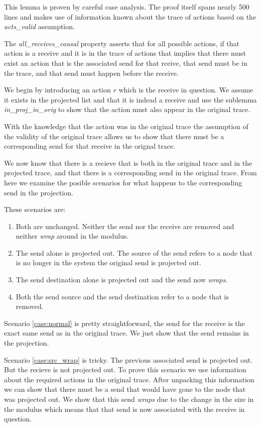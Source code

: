 \documentclass[runningheads]{llncs}
\begin{document}
This lemma is proven by careful case analysis. The proof itself spans nearly 500 lines and makes use of information known about the trace of actions based on the \emph{acts\_valid} assumption. 

The \emph{all\_receives\_causal} property asserts that for all possible actions, if that action is a receive and it is in the trace of actions that implies that there must exist an action that is the associated send for that rceive, that send must be in the trace, and that send must happen before the receive. 

We begin by introducing an action $r$ which is the receive in question. We assume it exists in the projected list and that it is indead a receive and use the sublemma \emph{in\_proj\_in\_orig} to show that the action must also appear in the original trace. 

With the knowledge that the action was in the original trace the assumption of the validity of the original trace allows us to show that there must be a corresponding send for that receive in the orignal trace. 

We now know that there is a recieve that is both in the original trace and in the projected trace, and that there is a corresponding send in the original trace. From here we examine the posible scenarios for what happens to the corresponding send in the projection.

These scenarios are:
\begin{enumerate}
\item \label{case:normal} Both are unchanged. Neither the send nor the receive are removed and neither \emph{wrap} around in the modulus.
\item \label{case:src_wrap} The send alone is projected out. The source of the send refers to a node that is no longer in the system the original send is projected out.
\item \label{case:dest_wrap} The send destination alone is projected out and the send now \emph{wraps}.
\item \label{case:both_wrap} Both the send source and the send destination refer to a node that is removed. 
\end{enumerate}


Scenario \ref{case:normal} is pretty straightforward, the send for the receive is the exact same send as in the original trace. We just show that the send remains in the projection.

Scenario \ref{case:src_wrap} is tricky. The previous associated send is projected out. But the recieve is not projected out. To prove this scenario we use information about the required actions in the original trace. After unpacking this information we can show that there must be a send that would have gone to the node that was projected out. We show that this send \emph{wraps} due to the change in the size in the modulus which means that that send is now associated with the receive in question.
\end{document}
